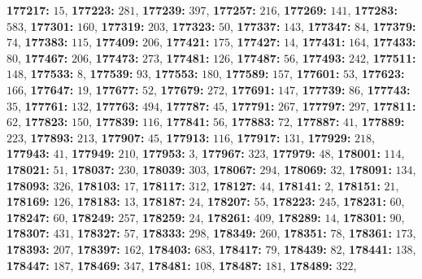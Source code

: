 \textsf{\bfseries 177217:} $15$, \textsf{\bfseries 177223:} $281$, \textsf{\bfseries 177239:} $397$, \textsf{\bfseries 177257:} $216$, \textsf{\bfseries 177269:} $141$, \textsf{\bfseries 177283:} $583$, \textsf{\bfseries 177301:} $160$, \textsf{\bfseries 177319:} $203$, \textsf{\bfseries 177323:} $50$, \textsf{\bfseries 177337:} $143$, \textsf{\bfseries 177347:} $84$, \textsf{\bfseries 177379:} $74$, \textsf{\bfseries 177383:} $115$, \textsf{\bfseries 177409:} $206$, \textsf{\bfseries 177421:} $175$, \textsf{\bfseries 177427:} $14$, \textsf{\bfseries 177431:} $164$, \textsf{\bfseries 177433:} $80$, \textsf{\bfseries 177467:} $206$, \textsf{\bfseries 177473:} $273$, \textsf{\bfseries 177481:} $126$, \textsf{\bfseries 177487:} $56$, \textsf{\bfseries 177493:} $242$, \textsf{\bfseries 177511:} $148$, \textsf{\bfseries 177533:} $8$, \textsf{\bfseries 177539:} $93$, \textsf{\bfseries 177553:} $180$, \textsf{\bfseries 177589:} $157$, \textsf{\bfseries 177601:} $53$, \textsf{\bfseries 177623:} $166$, \textsf{\bfseries 177647:} $19$, \textsf{\bfseries 177677:} $52$, \textsf{\bfseries 177679:} $272$, \textsf{\bfseries 177691:} $147$, \textsf{\bfseries 177739:} $86$, \textsf{\bfseries 177743:} $35$, \textsf{\bfseries 177761:} $132$, \textsf{\bfseries 177763:} $494$, \textsf{\bfseries 177787:} $45$, \textsf{\bfseries 177791:} $267$, \textsf{\bfseries 177797:} $297$, \textsf{\bfseries 177811:} $62$, \textsf{\bfseries 177823:} $150$, \textsf{\bfseries 177839:} $116$, \textsf{\bfseries 177841:} $56$, \textsf{\bfseries 177883:} $72$, \textsf{\bfseries 177887:} $41$, \textsf{\bfseries 177889:} $223$, \textsf{\bfseries 177893:} $213$, \textsf{\bfseries 177907:} $45$, \textsf{\bfseries 177913:} $116$, \textsf{\bfseries 177917:} $131$, \textsf{\bfseries 177929:} $218$, \textsf{\bfseries 177943:} $41$, \textsf{\bfseries 177949:} $210$, \textsf{\bfseries 177953:} $3$, \textsf{\bfseries 177967:} $323$, \textsf{\bfseries 177979:} $48$, \textsf{\bfseries 178001:} $114$, \textsf{\bfseries 178021:} $51$, \textsf{\bfseries 178037:} $230$, \textsf{\bfseries 178039:} $303$, \textsf{\bfseries 178067:} $294$, \textsf{\bfseries 178069:} $32$, \textsf{\bfseries 178091:} $134$, \textsf{\bfseries 178093:} $326$, \textsf{\bfseries 178103:} $17$, \textsf{\bfseries 178117:} $312$, \textsf{\bfseries 178127:} $44$, \textsf{\bfseries 178141:} $2$, \textsf{\bfseries 178151:} $21$, \textsf{\bfseries 178169:} $126$, \textsf{\bfseries 178183:} $13$, \textsf{\bfseries 178187:} $24$, \textsf{\bfseries 178207:} $55$, \textsf{\bfseries 178223:} $245$, \textsf{\bfseries 178231:} $60$, \textsf{\bfseries 178247:} $60$, \textsf{\bfseries 178249:} $257$, \textsf{\bfseries 178259:} $24$, \textsf{\bfseries 178261:} $409$, \textsf{\bfseries 178289:} $14$, \textsf{\bfseries 178301:} $90$, \textsf{\bfseries 178307:} $431$, \textsf{\bfseries 178327:} $57$, \textsf{\bfseries 178333:} $298$, \textsf{\bfseries 178349:} $260$, \textsf{\bfseries 178351:} $78$, \textsf{\bfseries 178361:} $173$, \textsf{\bfseries 178393:} $207$, \textsf{\bfseries 178397:} $162$, \textsf{\bfseries 178403:} $683$, \textsf{\bfseries 178417:} $79$, \textsf{\bfseries 178439:} $82$, \textsf{\bfseries 178441:} $138$, \textsf{\bfseries 178447:} $187$, \textsf{\bfseries 178469:} $347$, \textsf{\bfseries 178481:} $108$, \textsf{\bfseries 178487:} $181$, \textsf{\bfseries 178489:} $322$, 
